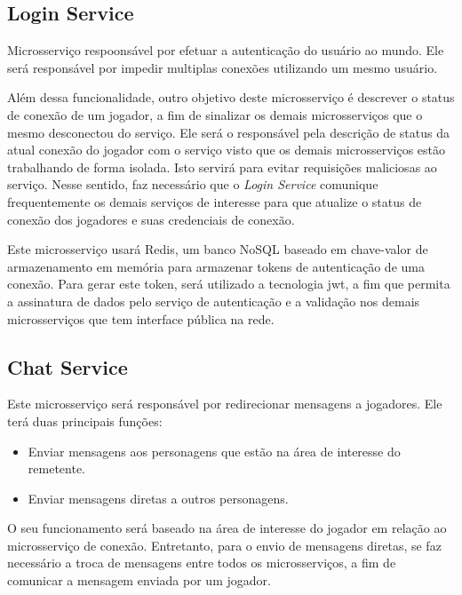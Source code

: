 \subsection{Login Service}



Microsserviço respoonsável por efetuar a autenticação do usuário ao mundo.
%
Ele será responsável por impedir multiplas conexões utilizando um mesmo usuário.



Além dessa funcionalidade, outro objetivo deste microsserviço é descrever o status de conexão de um jogador, a fim de sinalizar os demais microsserviços que o mesmo desconectou do serviço.
%
Ele será o responsável pela descrição de status da atual conexão do jogador com o serviço visto que os demais microsserviços estão trabalhando de forma isolada.
%
Isto servirá para evitar requisições maliciosas ao serviço.
%
Nesse sentido, faz necessário que o \textit{Login Service} comunique frequentemente os demais serviços de interesse para que atualize o status de conexão dos jogadores e suas credenciais de conexão.



Este microsserviço usará Redis, um banco NoSQL baseado em chave-valor de armazenamento em memória para armazenar tokens de autenticação de uma conexão.
%
Para gerar este token, será utilizado a tecnologia \ac{jwt}, a fim que permita a assinatura de dados pelo serviço de autenticação e a validação nos demais microsserviços que tem interface pública na rede.



\subsection{Chat Service}


Este microsserviço será responsável por redirecionar mensagens a jogadores.
%
Ele terá duas principais funções:



\begin{itemize}
  \item Enviar mensagens aos personagens que estão na área de interesse do remetente.
  \item Enviar mensagens diretas a outros personagens.
\end{itemize}



O seu funcionamento será baseado na área de interesse do jogador em relação ao microsserviço de conexão.
%
Entretanto, para o envio de mensagens diretas, se faz necessário a troca de mensagens entre todos os microsserviços, a fim de comunicar a mensagem enviada por um jogador.



